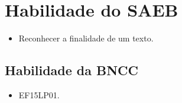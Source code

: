 
\section*{Habilidade do SAEB}

\begin{itemize}
\item Reconhecer a finalidade de um texto.
\end{itemize}

\subsection{Habilidade da BNCC}

\begin{itemize}
\item EF15LP01.
\end{itemize}

